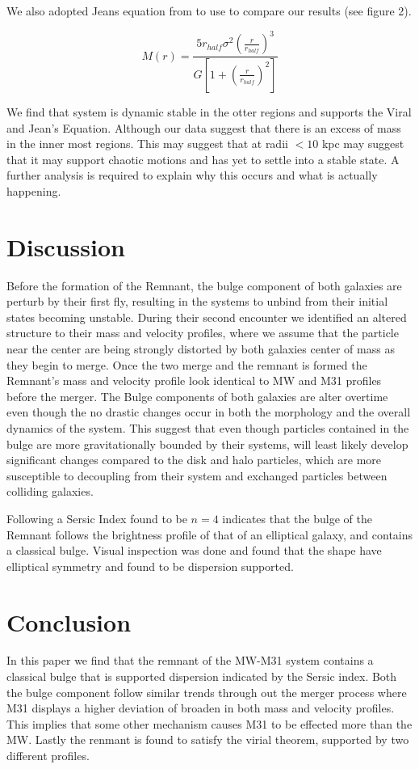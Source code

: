 \documentclass[iop]{emulateapj}
\begin{document}
We also adopted Jeans equation from \citep{walker2009universal} to use to compare our results (see figure 2).
	
    \begin{equation}
	M(r)=\frac{5r_{half}\sigma^{2}(\frac{r}{r_{half}})^{3}}{G[1+(\frac{r}{r_{half}})^{2}]}
	\end{equation}
    
We find that system is dynamic stable in the otter regions and supports the Viral and Jean's Equation. Although our data suggest that there is an excess of mass in the inner most regions. This may suggest that at radii $<10$ kpc may suggest that it may support chaotic motions and has yet to settle into a stable state. A further analysis is required to explain why this occurs and what is actually happening.

\section{Discussion}
Before the formation of the Remnant, the bulge component of both galaxies are perturb by their first fly, resulting in the systems to unbind from their initial states becoming unstable. During their second encounter we identified an altered structure to their mass and velocity profiles, where we assume that the particle near the center are being strongly distorted by both galaxies center of mass as they begin to merge. Once the two merge and the remnant is formed the Remnant's mass and velocity profile look identical to MW and M31 profiles before the merger. The Bulge components of both galaxies are alter overtime even though the no drastic changes occur in both the morphology and the overall dynamics of the system. This suggest that even though particles contained in the bulge are more gravitationally bounded by their systems, will least likely develop significant changes compared to the disk and halo particles, which are more susceptible to decoupling from their system and exchanged particles between colliding galaxies.

Following a Sersic Index found to be $n=4$ indicates that the bulge of the Remnant follows the brightness profile of that of an elliptical galaxy, and contains a classical bulge. Visual inspection was done and found that the shape have elliptical symmetry and found to be dispersion supported.	

\section{Conclusion}
In this paper we find that the remnant of the MW-M31 system contains a classical bulge that is supported dispersion indicated by the Sersic index. Both the bulge component follow similar trends through out the merger process where M31 displays a higher deviation of broaden in both mass and velocity profiles. This implies that some other mechanism causes M31 to be effected more than the MW. Lastly the renmant is found to satisfy the virial theorem, supported by two different profiles. 
\end{document}

